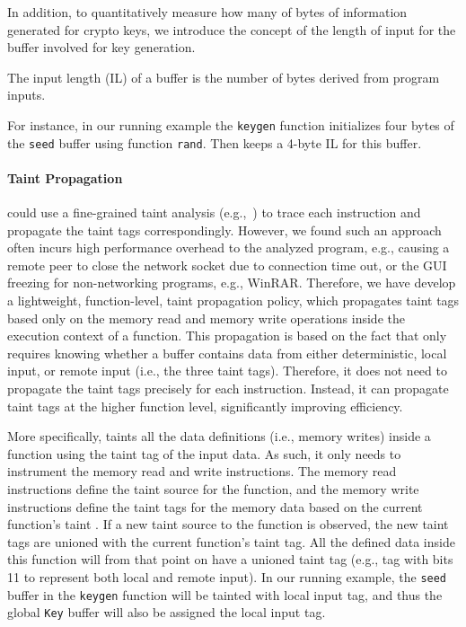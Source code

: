 {In addition, to quantitatively measure how many of bytes of information generated for crypto keys, we introduce the concept of the length of input for the buffer involved for key generation.
\begin{Definition}
The input length (IL) of a buffer is the number of bytes derived from program inputs.
\end{Definition}
\noindent
For instance, in our running example the \texttt{keygen} function initializes four bytes of the \texttt{seed} buffer using function \texttt{rand}. Then \sysname keeps a 4-byte IL for this buffer.


\paragraph{Taint Propagation} \sysname could use a fine-grained taint analysis (e.g.,~\cite{song2005ndss}) to trace each instruction and propagate the taint tags correspondingly. 
However, we found such an approach often incurs high performance overhead to the analyzed program, e.g., causing a remote peer to close the network socket due to connection time out, or the GUI freezing for non-networking programs, e.g., \textsf{\small WinRAR}. 
Therefore, we have develop a lightweight, function-level, taint propagation policy, which propagates  taint tags based only on the memory read and memory write operations inside the execution context of a function.
This propagation is based on the fact that \sysname only requires knowing whether a buffer contains data from either deterministic, local input, or remote input (i.e., the three taint tags). 
Therefore, it does not need to propagate the taint tags precisely for each instruction. 
Instead, it can propagate taint tags at the higher function level, significantly improving efficiency.

More specifically, \sysname taints all the data definitions (i.e., memory writes) inside a function using the taint tag of the input data. 
As such, it only needs to instrument the memory read and write instructions. 
The memory read instructions define the taint source for the function, and the memory write instructions define the taint tags for the memory data based on the current function's taint . 
If a new taint source to the function is observed, the new taint tags are unioned with the current function's taint tag. All the defined data inside this function will from that point on have a unioned taint tag (e.g., tag with bits 11 to represent both local and remote input). 
In our running example, the \texttt{seed} buffer in the \texttt{keygen} function  will be tainted with local input tag, and thus the global \texttt{Key} buffer will also be assigned the local input tag. 




}
